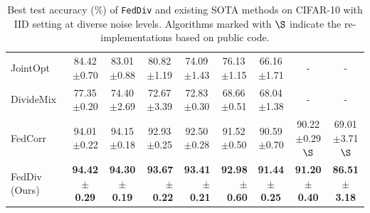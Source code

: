 \documentclass[letterpaper]{article} %
\begin{document}
\begin{table}[t]
{\begin{tabular}{l|ccrrrccc}
        JointOpt~\cite{JointOpt}          & 84.42$\pm$0.70          & 83.01$\pm$0.88          & \multicolumn{1}{c}{80.82$\pm$1.19} & \multicolumn{1}{c}{74.09$\pm$1.43} & \multicolumn{1}{c}{76.13$\pm$1.15} & 66.16$\pm$1.71          & -                       & - \\
        DivideMix~\cite{li2019dividemix}  & 77.35$\pm$0.20          & 74.40$\pm$2.69          & \multicolumn{1}{c}{72.67$\pm$3.39} & \multicolumn{1}{c}{72.83$\pm$0.30} & \multicolumn{1}{c}{68.66$\pm$0.51} & 68.04$\pm$1.38          & -                       & - \\
        FedCorr~\cite{xu2022fedcorr}      & 94.01$\pm$0.22          & 94.15$\pm$0.18          & \multicolumn{1}{c}{92.93$\pm$0.25} & \multicolumn{1}{c}{92.50$\pm$0.28} & \multicolumn{1}{c}{91.52$\pm$0.50} & 90.59$\pm$0.70          & 90.22$\pm$0.29$\S$      & 69.01$\pm$3.71$\S$\\
        FedDiv (Ours)                     & \textbf{94.42$\pm$0.29} & \textbf{94.30$\pm$0.19} & \textbf{93.67$\pm$0.22}            & \textbf{93.41$\pm$0.21}            & \textbf{92.98$\pm$0.60}            & \textbf{91.44$\pm$0.25} & \textbf{91.20$\pm$0.40} & \textbf{86.51$\pm$3.18} \\
        \bottomrule
    \end{tabular}%
    }
    
    \caption{Best test accuracy (\%) of \texttt{FedDiv} and existing SOTA methods on CIFAR-10 with IID setting at diverse noise levels. 
    Algorithms marked with $\S$ indicate the re-implementations based on public code.}
    \label{Table:CIFAR10-IID}%
    
\end{table}%
\end{document}
